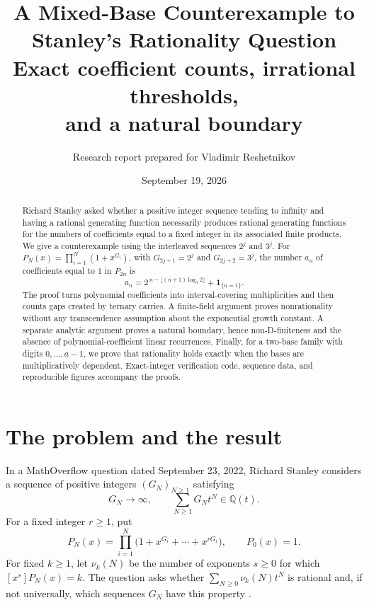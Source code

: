 \documentclass[11pt,letterpaper]{article}
\title{\vspace{-1.4em}\textbf{A Mixed-Base Counterexample to\\
Stanley's Rationality Question}\\[0.35em]
\large Exact coefficient counts, irrational thresholds,\\and a natural boundary}
\author{\normalsize Research report prepared for Vladimir Reshetnikov}
\date{\normalsize September 19, 2026}
\numberwithin{equation}{section}
\theoremstyle{definition}
\theoremstyle{remark}
\newcommand{\Q}{\mathbb{Q}}
\newcommand{\ind}[1]{\boldsymbol{1}_{\{#1\}}}
\begin{document}
\maketitle
\vspace{-1.2em}
\begin{abstract}
Richard Stanley asked whether a positive integer sequence tending to infinity
and having a rational generating function necessarily produces rational
generating functions for the numbers of coefficients equal to a fixed integer
in its associated finite products. We give a counterexample using the
interleaved sequences $2^j$ and $3^j$. For
$P_N(x)=\prod_{i=1}^N(1+x^{G_i})$, with $G_{2j+1}=2^j$ and
$G_{2j+2}=3^j$, the number $a_n$ of coefficients equal to $1$ in $P_{2n}$ is
\[
 a_n=2^{\,n-\lfloor(n+1)\log_3 2\rfloor}+\ind{n=1}.
\]
The proof turns polynomial coefficients into interval-covering
multiplicities and then counts gaps created by ternary carries.
A finite-field argument proves nonrationality without any transcendence
assumption about the exponential growth constant. A separate analytic argument
proves a natural boundary, hence non-D-finiteness and the absence of
polynomial-coefficient linear recurrences. Finally, for a two-base family
with digits $0,\ldots,a-1$, we prove that rationality holds exactly when
the bases are multiplicatively dependent. Exact-integer verification code,
sequence data, and reproducible figures accompany the proofs.
\end{abstract}
\vspace{-0.6em}
\begingroup
\small
\setlength{\parskip}{0pt}
\tableofcontents
\endgroup
\clearpage

\section{The problem and the result}\label{sec:problem}

In a MathOverflow question dated September 23, 2022, Richard Stanley considers
a sequence of positive integers $(G_N)_{N\ge1}$ satisfying
\begin{equation}\label{eq:hypotheses}
 G_N\longrightarrow\infty,
 \qquad \sum_{N\ge1}G_Nt^N\in\Q(t).
\end{equation}
For a fixed integer $r\ge1$, put
\begin{equation}\label{eq:stanleyproduct}
 P_N(x)=\prod_{i=1}^N\bigl(1+x^{G_i}+\cdots+x^{rG_i}\bigr),
 \qquad P_0(x)=1.
\end{equation}
For fixed $k\ge1$, let $\nu_k(N)$ be the number of exponents $s\ge0$ for
which $[x^s]P_N(x)=k$. The question asks whether
$\sum_{N\ge0}\nu_k(N)t^N$ is rational and, if not universally, which
sequences $G_N$ have this property \cite{StanleyMO}.
\end{document}
